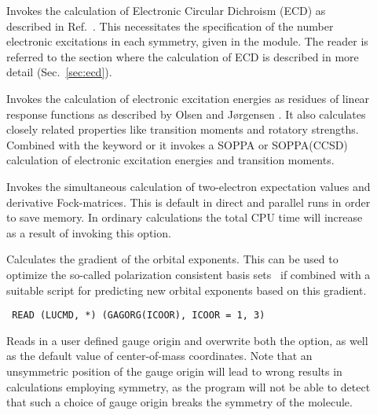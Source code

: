 \begin{description}
\item[] Invokes the calculation of Electronic Circular
Dichroism (ECD) as
described in Ref.~\cite{klbaehkrthjopjtca90,mpkrthcpl388}. This 
necessitates the specification of the number electronic
excitations in 
each symmetry, given in the  module. The reader is
referred to the section where the calculation of ECD is described in
more detail (Sec.~\ref{sec:ecd}).

\item[] Invokes the calculation of electronic
excitation
energies as residues of linear response functions
as described by Olsen and J\o rgensen \cite{jopjjcp82}. It also
calculates closely related properties like transition
moments and 
rotatory strengths. Combined with the 
keyword  or  it invokes a SOPPA 
or SOPPA(CCSD) calculation of electronic
excitation energies and transition moments.


\item[] Invokes the simultaneous calculation of
two-electron expectation values and derivative Fock-matrices. This is
default in direct and parallel runs in order to save memory. In
ordinary calculations the total CPU time will increase as a result of
invoking this option.

\item[] Calculates the gradient of the orbital
  exponents. This can be used to optimize the so-called polarization
  consistent basis sets~\cite{fjjcp115} if combined with a suitable script for
  predicting new orbital exponents based on this gradient.

\item[]\verb| |\newline
\verb|READ (LUCMD, *) (GAGORG(ICOOR), ICOOR = 1, 3)|

Reads in a user defined gauge origin and overwrite
both the  option, as well as the default value of
center-of-mass coordinates. Note that an unsymmetric position of the
gauge origin will lead to wrong results in calculations employing
symmetry, as the program will not be able to detect that such a choice
of gauge origin breaks the symmetry of the molecule.


\end{description}
